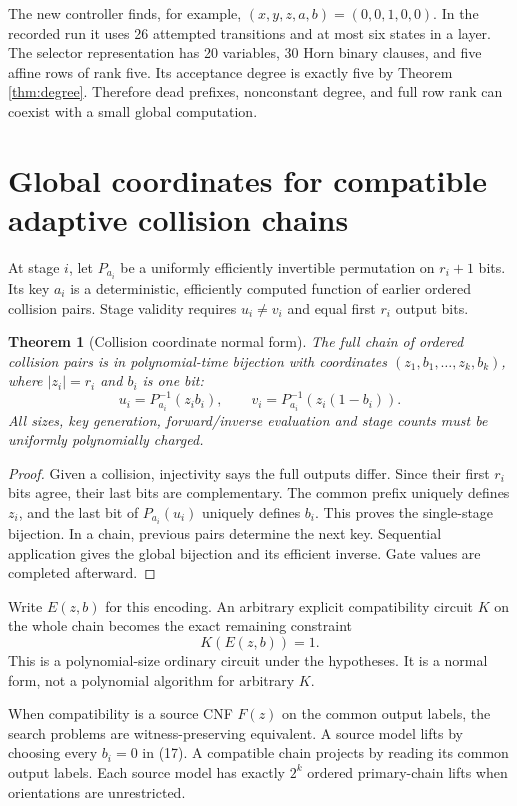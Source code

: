 \documentclass[11pt]{article}
\newtheorem{theorem}{Theorem}
\begin{document}
The new controller finds, for example,
$(x,y,z,a,b)=(0,0,1,0,0)$.
In the recorded run it uses 26 attempted transitions and at most six
states in a layer.
The selector representation has 20 variables, 30 Horn binary clauses,
and five affine rows of rank five.
Its acceptance degree is exactly five by Theorem \ref{thm:degree}.
Therefore dead prefixes, nonconstant degree, and full row rank can
coexist with a small global computation.

\section{Global coordinates for compatible adaptive collision chains}
At stage $i$, let $P_{a_i}$ be a uniformly efficiently invertible
permutation on $r_i+1$ bits. Its key $a_i$ is a deterministic,
efficiently computed function of earlier ordered collision pairs.
Stage validity requires $u_i\ne v_i$ and equal first $r_i$ output bits.

\begin{theorem}[Collision coordinate normal form]\label{thm:coords}
The full chain of ordered collision pairs is in polynomial-time
bijection with coordinates
$(z_1,b_1,\ldots,z_k,b_k)$, where $|z_i|=r_i$ and $b_i$ is one bit:
\[
 u_i=P_{a_i}^{-1}(z_i b_i),\qquad
 v_i=P_{a_i}^{-1}(z_i(1-b_i)).
 \tag{17}
\]
All sizes, key generation, forward/inverse evaluation and stage counts
must be uniformly polynomially charged.
\end{theorem}

\begin{proof}
Given a collision, injectivity says the full outputs differ. Since
their first $r_i$ bits agree, their last bits are complementary.
The common prefix uniquely defines $z_i$, and the last bit of
$P_{a_i}(u_i)$ uniquely defines $b_i$. This proves the single-stage
bijection. In a chain, previous pairs determine the next key.
Sequential application gives the global bijection and its efficient
inverse. Gate values are completed afterward.
\end{proof}

Write $E(z,b)$ for this encoding.
An arbitrary explicit compatibility circuit $K$ on the whole chain
becomes the exact remaining constraint
\[
 K(E(z,b))=1.
 \tag{18}
\]
This is a polynomial-size ordinary circuit under the hypotheses.
It is a normal form, not a polynomial algorithm for arbitrary $K$.

When compatibility is a source CNF $F(z)$ on the common output labels,
the search problems are witness-preserving equivalent.
A source model lifts by choosing every $b_i=0$ in (17).
A compatible chain projects by reading its common output labels.
Each source model has exactly $2^k$ ordered primary-chain lifts
when orientations are unrestricted.
\end{document}
